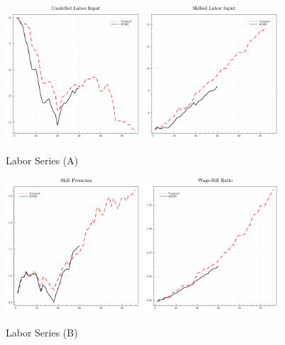 \documentclass[12pt]{article}
\begin{document}
\begin{figure}
 \centering
 \includegraphics[width=0.45\textwidth]{../images/labor_input_unskilled_doc.pdf}
 \hspace*{0.05\textwidth}
 \includegraphics[width=0.45\textwidth]{../images/labor_input_skilled_doc.pdf}
 \caption{\label{fig:labor_series_1} Labor Series (A)}
\end{figure}
\begin{figure}
    \centering
 \includegraphics[width=0.45\textwidth]{../images/sp_doc.pdf}
 \hspace*{0.05\textwidth}
 \includegraphics[width=0.45\textwidth]{../images/wbr_doc.pdf}
 \caption{\label{fig:labor_series_2} Labor Series (B)}
\end{figure}
\end{document}
